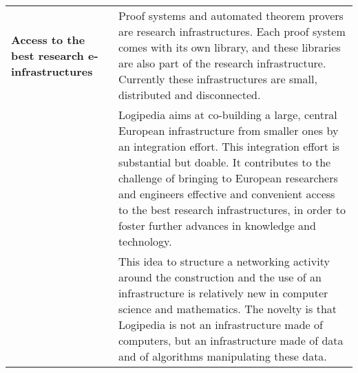 \begin{longtable}{|p{}|p{}|}
\hline
{\bf Access to the best research e-infrastructures}
&
Proof systems and automated theorem provers are research
infrastructures. Each proof system comes with its own library, and
these libraries are also part of the research infrastructure.  Currently
these infrastructures are small, distributed and disconnected.\\
&
\hspace{0.4cm} Logipedia aims at co-building a large, central European
infrastructure from smaller ones by an integration effort.  This
integration effort is substantial but doable. It contributes to the
challenge of bringing to European researchers and engineers effective
and convenient access to the best research infrastructures, in order
to foster further advances in knowledge and technology.
\\
&
\hspace{0.4cm} This idea to structure a networking activity around the
construction and the use of an infrastructure is relatively new in
computer science and mathematics. The novelty is that Logipedia is not
an infrastructure made of computers, but an infrastructure made of
data and of algorithms manipulating these data.
\\
\hline


\end{longtable}
